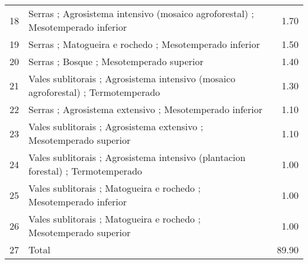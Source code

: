 \begin{table}[p]
\begin{tabular}{rlr}
  18 & Serras ; Agrosistema intensivo (mosaico agroforestal) ; Mesotemperado inferior & 1.70 \\ 
  19 & Serras ; Matogueira e rochedo ; Mesotemperado inferior & 1.50 \\ 
  20 & Serras ; Bosque ; Mesotemperado superior & 1.40 \\ 
  21 & Vales sublitorais ; Agrosistema intensivo (mosaico agroforestal) ; Termotemperado & 1.30 \\ 
  22 & Serras ; Agrosistema extensivo ; Mesotemperado inferior & 1.10 \\ 
  23 & Vales sublitorais ; Agrosistema extensivo ; Mesotemperado superior & 1.10 \\ 
  24 & Vales sublitorais ; Agrosistema intensivo (plantacion forestal) ; Termotemperado & 1.00 \\ 
  25 & Vales sublitorais ; Matogueira e rochedo ; Mesotemperado inferior & 1.00 \\ 
  26 & Vales sublitorais ; Matogueira e rochedo ; Mesotemperado superior & 1.00 \\ 
  27 & Total & 89.90 \\ 
   \hline
\end{tabular}
\end{table}
